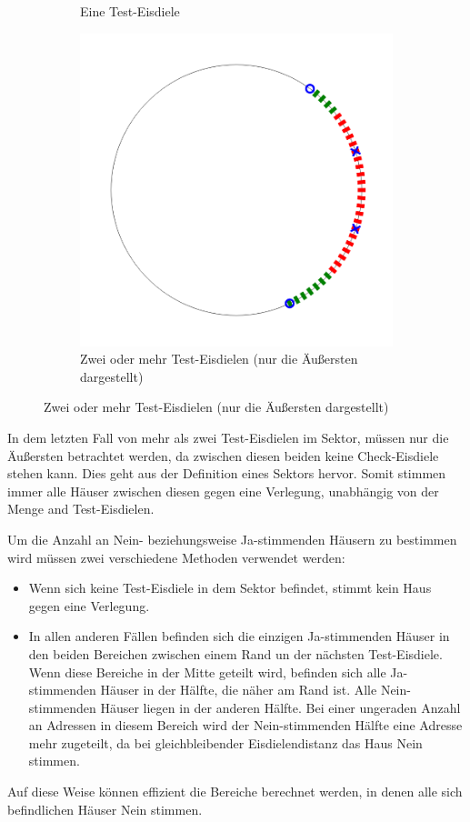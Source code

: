 \documentclass[a4paper,10pt,ngerman]{scrartcl}
\newcommand{\imageWidth}{0.3\linewidth}
\begin{document}
\begin{figure}[ht]
\begin{subfigure}[t]{\imageWidth}
        \caption{Eine Test-Eisdiele}
        \label{fig:07_one_test_ice}
    \end{subfigure}
    \begin{subfigure}[t]{\imageWidth}
        \includegraphics[width=\linewidth]{08_two_test_ice.png}
        \caption{Zwei oder mehr Test-Eisdielen (nur die Äußersten dargestellt)}
        \label{fig:08_two_test_ice}
    \end{subfigure}
\end{figure}
In dem letzten Fall von mehr als zwei Test-Eisdielen im Sektor, müssen nur die Äußersten betrachtet werden, da zwischen diesen beiden keine Check-Eisdiele stehen kann.
Dies geht aus der Definition eines Sektors hervor.
Somit stimmen immer alle Häuser zwischen diesen gegen eine Verlegung, unabhängig von der Menge and Test-Eisdielen.

Um die Anzahl an Nein- beziehungsweise Ja-stimmenden Häusern zu bestimmen wird müssen zwei verschiedene Methoden verwendet werden:
\begin{itemize}
    \item Wenn sich keine Test-Eisdiele in dem Sektor befindet, stimmt kein Haus gegen eine Verlegung.
    \item In allen anderen Fällen befinden sich die einzigen Ja-stimmenden Häuser in den beiden Bereichen zwischen einem Rand un der nächsten Test-Eisdiele.
          Wenn diese Bereiche in der Mitte geteilt wird, befinden sich alle Ja-stimmenden Häuser in der Hälfte, die näher am Rand ist.
          Alle Nein-stimmenden Häuser liegen in der anderen Hälfte.
          Bei einer ungeraden Anzahl an Adressen in diesem Bereich wird der Nein-stimmenden Hälfte eine Adresse mehr zugeteilt, da bei gleichbleibender Eisdielendistanz das Haus Nein stimmen.
\end{itemize}
Auf diese Weise können effizient die Bereiche berechnet werden, in denen alle sich befindlichen Häuser Nein stimmen.
\end{document}
